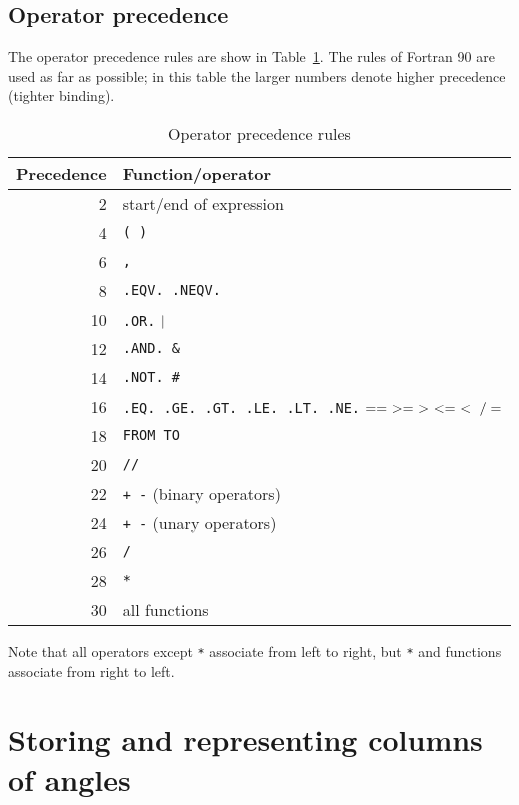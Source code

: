 \documentclass[twoside,11pt]{article}
\newcommand{\xlabel}[1]{}
\renewcommand{\_}{\texttt{\symbol{95}}}
\begin{document}
\subsection{Operator precedence}

The operator precedence rules are show in Table~\ref{PREC}. The rules 
of Fortran 90 are used as far as possible; in this table the larger 
numbers denote higher precedence (tighter binding).

\begin{table}[htbp]

\begin{center}
\begin{tabular}{rl}
Precedence  & Function/operator  \\ \hline
  2 & start/end of expression  \\
  4 & {\tt (  )}  \\
  6 & {\tt ,}  \\
  8 & {\tt .EQV.  .NEQV.}  \\
 10 & {\tt  .OR.}   ${\tt |}$  \\
 12 & {\tt .AND.  \&} \\
 14 & {\tt .NOT.  \#}  \\
 16 & {\tt .EQ. .GE. .GT. .LE. .LT. .NE.} ${\tt == ~ >= ~ > ~ <= ~ < ~ /=}$ \\
 18 & {\tt FROM  TO}  \\
 20 & {\tt  //}  \\
 22 & {\tt  + -} (binary operators)  \\
 24 & {\tt  + -} (unary operators)  \\
 26 & {\tt  * /}  \\
 28 & {\tt  **}  \\
 30 & all functions  \\
\end{tabular}
\end{center}

\caption{Operator precedence rules\label{PREC} }

\end{table}

Note that all operators except {\tt **} associate from left to right, but
{\tt **} and functions associate from right to left.


\section{\xlabel{ANGLE}\label{ANGLE}Storing and representing columns of angles}
\end{document}
